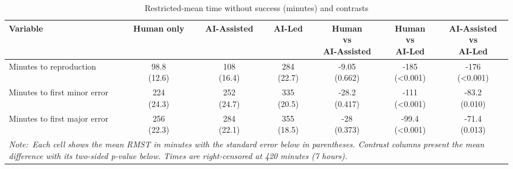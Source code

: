 \begin{table}[ht]
\tiny
\centering
\caption{Restricted-mean time without success (minutes) and contrasts} 
\label{tab:rmst}
\begin{tabular}{lcccccc}
  \hline\hline
Variable & Human only & AI-Assisted & AI-Led & \shortstack{Human\\vs\\AI-Assisted} & \shortstack{Human\\vs\\AI-Led} & \shortstack{AI-Assisted\\vs\\AI-Led} \\ 
  \hline\hline
Minutes to reproduction & \shortstack{98.8\\(12.6)} & \shortstack{ 108\\(16.4)} & \shortstack{ 284\\(22.7)} & \shortstack{-9.05\\(0.662)} & \shortstack{-185\\(<0.001)} & \shortstack{-176\\(<0.001)} \\ 
  Minutes to first minor error & \shortstack{ 224\\(24.3)} & \shortstack{ 252\\(24.7)} & \shortstack{ 335\\(20.5)} & \shortstack{-28.2\\(0.417)} & \shortstack{-111\\(<0.001)} & \shortstack{-83.2\\(0.010)} \\ 
  Minutes to first major error & \shortstack{ 256\\(22.3)} & \shortstack{ 284\\(22.1)} & \shortstack{ 355\\(18.5)} & \shortstack{ -28\\(0.373)} & \shortstack{-99.4\\(<0.001)} & \shortstack{-71.4\\(0.013)} \\ 
   \hline\hline
\multicolumn{7}{p{0.6\textwidth}}{\it Note:~Each cell shows the mean RMST in minutes with the standard error below in parentheses. Contrast columns present the mean difference with its two-sided \emph{p}-value below. Times are right-censored at 420 minutes (7 hours).}
\end{tabular}
\end{table}
